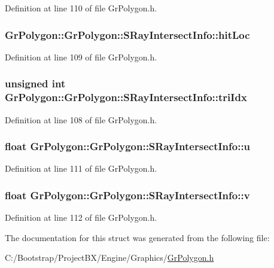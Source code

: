 Definition at line 110 of file GrPolygon.h.\hypertarget{struct_gr_polygon_1_1_s_ray_intersect_info_087c70a3931cf6fcafc953d94954bcb8}{
\subsubsection[{hitLoc}]{ GrPolygon::GrPolygon::SRayIntersectInfo::hitLoc}}
\label{struct_gr_polygon_1_1_s_ray_intersect_info_087c70a3931cf6fcafc953d94954bcb8}




Definition at line 109 of file GrPolygon.h.\hypertarget{struct_gr_polygon_1_1_s_ray_intersect_info_c4b5c6b949c43838c3f83283daa1c9b1}{
\subsubsection[{triIdx}]{\setlength{\rightskip}{0pt plus 5cm}unsigned int GrPolygon::GrPolygon::SRayIntersectInfo::triIdx}}
\label{struct_gr_polygon_1_1_s_ray_intersect_info_c4b5c6b949c43838c3f83283daa1c9b1}




Definition at line 108 of file GrPolygon.h.\hypertarget{struct_gr_polygon_1_1_s_ray_intersect_info_b6f863c07d54a23eb721e226f61012f2}{
\subsubsection[{u}]{\setlength{\rightskip}{0pt plus 5cm}float GrPolygon::GrPolygon::SRayIntersectInfo::u}}
\label{struct_gr_polygon_1_1_s_ray_intersect_info_b6f863c07d54a23eb721e226f61012f2}




Definition at line 111 of file GrPolygon.h.\hypertarget{struct_gr_polygon_1_1_s_ray_intersect_info_c3a6d5dd4e36f69a660d74430f51e092}{
\subsubsection[{v}]{\setlength{\rightskip}{0pt plus 5cm}float {\bf GrPolygon::GrPolygon::SRayIntersectInfo::v}}}
\label{struct_gr_polygon_1_1_s_ray_intersect_info_c3a6d5dd4e36f69a660d74430f51e092}




Definition at line 112 of file GrPolygon.h.

The documentation for this struct was generated from the following file:\begin{CompactItemize}
\item 
C:/Bootstrap/ProjectBX/Engine/Graphics/\hyperlink{_gr_polygon_8h}{GrPolygon.h}\end{CompactItemize}
